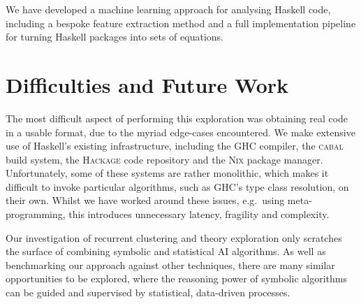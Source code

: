 \documentclass[]{default}
\begin{document}
We have developed a machine learning approach for analysing Haskell code, including a
bespoke feature extraction method and a full implementation pipeline for turning Haskell packages into sets of equations.

\section{Difficulties and Future Work}\label{future-work}

The most difficult aspect of performing this exploration was obtaining real code in a usable format, due to the myriad edge-cases encountered. We make extensive use of Haskell's existing infrastructure, including the \textsc{GHC} compiler, the \textsc{cabal} build system, the \textsc{Hackage} code repository and the \textsc{Nix} package manager. Unfortunately, some of these systems are rather monolithic, which makes it difficult to invoke particular algorithms, such as \textsc{GHC}'s type class resolution, on their own. Whilst we have worked around these issues, e.g.\ using meta-programming, this introduces unnecessary latency, fragility and complexity.

Our investigation of recurrent clustering and theory exploration only scratches the surface of combining symbolic and statistical AI algorithms. As well as benchmarking our approach against other techniques, there are many similar opportunities to be explored, where the reasoning power of symbolic algorithms can be guided and supervised by statistical, data-driven processes.



\end{document}
